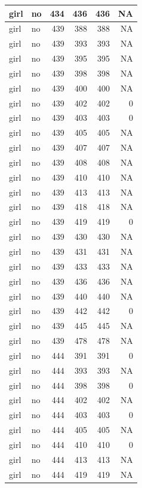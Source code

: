 \documentclass[man]{apa6}
\begin{document}
\begin{tabular}{l|l|r|r|r|r}
\hline
girl & no & 434 & 436 & 436 & NA\\
\hline
girl & no & 439 & 388 & 388 & NA\\
\hline
girl & no & 439 & 393 & 393 & NA\\
\hline
girl & no & 439 & 395 & 395 & NA\\
\hline
girl & no & 439 & 398 & 398 & NA\\
\hline
girl & no & 439 & 400 & 400 & NA\\
\hline
girl & no & 439 & 402 & 402 & 0\\
\hline
girl & no & 439 & 403 & 403 & 0\\
\hline
girl & no & 439 & 405 & 405 & NA\\
\hline
girl & no & 439 & 407 & 407 & NA\\
\hline
girl & no & 439 & 408 & 408 & NA\\
\hline
girl & no & 439 & 410 & 410 & NA\\
\hline
girl & no & 439 & 413 & 413 & NA\\
\hline
girl & no & 439 & 418 & 418 & NA\\
\hline
girl & no & 439 & 419 & 419 & 0\\
\hline
girl & no & 439 & 430 & 430 & NA\\
\hline
girl & no & 439 & 431 & 431 & NA\\
\hline
girl & no & 439 & 433 & 433 & NA\\
\hline
girl & no & 439 & 436 & 436 & NA\\
\hline
girl & no & 439 & 440 & 440 & NA\\
\hline
girl & no & 439 & 442 & 442 & 0\\
\hline
girl & no & 439 & 445 & 445 & NA\\
\hline
girl & no & 439 & 478 & 478 & NA\\
\hline
girl & no & 444 & 391 & 391 & 0\\
\hline
girl & no & 444 & 393 & 393 & NA\\
\hline
girl & no & 444 & 398 & 398 & 0\\
\hline
girl & no & 444 & 402 & 402 & NA\\
\hline
girl & no & 444 & 403 & 403 & 0\\
\hline
girl & no & 444 & 405 & 405 & NA\\
\hline
girl & no & 444 & 410 & 410 & 0\\
\hline
girl & no & 444 & 413 & 413 & NA\\
\hline
girl & no & 444 & 419 & 419 & NA\\

\end{tabular}
\end{document}
